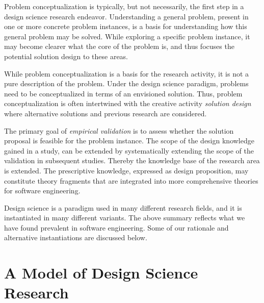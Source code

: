 \documentclass[graybox]{svmult}
\begin{document}
Problem conceptualization is typically, but not necessarily, the first step in a design science research endeavor. Understanding a general problem, present in one or more concrete problem instances, is a basis for understanding how this general problem may be solved.  While exploring a specific problem instance,  it may become clearer what the core of the problem is, and thus focuses the potential solution design to these areas. 

While problem conceptualization is a basis for the research activity, it is not a pure description of the problem. Under the design science paradigm, problems need to be conceptualized in terms of an envisioned solution. Thus, problem conceptualization is often intertwined with the creative activity \emph{solution design} where alternative solutions and previous research are considered. 


 The primary goal of \emph{empirical validation} is to assess whether the solution proposal is feasible for the problem instance. The scope of the design knowledge gained in a study, can be extended by systematically extending the scope of the validation in subsequent studies. Thereby the knowledge base of the research area is extended. The prescriptive knowledge, expressed as design proposition,  may constitute theory fragments that are integrated into more comprehensive theories for software engineering. 


Design science is a paradigm used in many different research fields, and it is instantiated in many different variants.  The above summary reflects what we have found prevalent in software engineering. Some of our rationale and alternative instantiations are discussed below.



\section{A Model of Design Science Research}
\label{sec:DesignScienceResearch}
\end{document}
